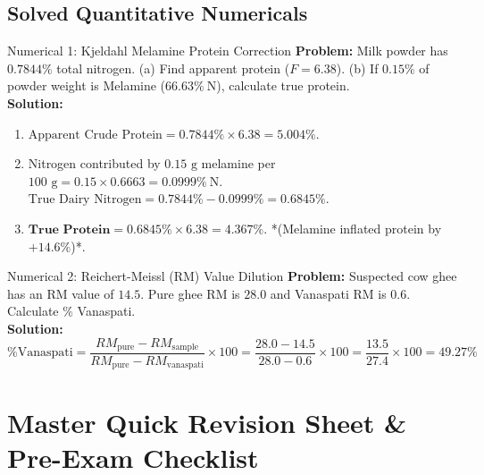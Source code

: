 \documentclass[10pt,a4paper,oneside]{article}
\begin{document}
\subsection{Solved Quantitative Numericals}
\begin{conceptbox}{Numerical 1: Kjeldahl Melamine Protein Correction}
\textbf{Problem:} Milk powder has $0.7844\%$ total nitrogen. (a) Find apparent protein ($F = 6.38$). (b) If $0.15\%$ of powder weight is Melamine ($66.63\%\ \mathrm{N}$), calculate true protein.\\
\textbf{Solution:}
\begin{enumerate}
    \item $\text{Apparent Crude Protein} = 0.7844\% \times 6.38 = \mathbf{5.004\%}$.
    \item Nitrogen contributed by $0.15\text{ g}$ melamine per $100\text{ g} = 0.15 \times 0.6663 = 0.0999\%\ \mathrm{N}$.\\
    $\text{True Dairy Nitrogen} = 0.7844\% - 0.0999\% = 0.6845\%$.
    \item $\mathbf{\text{True Protein}} = 0.6845\% \times 6.38 = \mathbf{4.367\%}$. *(Melamine inflated protein by $+14.6\%$)*.
\end{enumerate}
\end{conceptbox}

\begin{conceptbox}{Numerical 2: Reichert-Meissl (RM) Value Dilution}
\textbf{Problem:} Suspected cow ghee has an RM value of $14.5$. Pure ghee RM is $28.0$ and Vanaspati RM is $0.6$. Calculate $\%$ Vanaspati.\\
\textbf{Solution:}
$$\% \text{Vanaspati} = \frac{RM_{\text{pure}} - RM_{\text{sample}}}{RM_{\text{pure}} - RM_{\text{vanaspati}}} \times 100 = \frac{28.0 - 14.5}{28.0 - 0.6} \times 100 = \frac{13.5}{27.4} \times 100 = \mathbf{49.27\%}$$
\end{conceptbox}

\newpage

\section{Master Quick Revision Sheet \& Pre-Exam Checklist}
\end{document}
